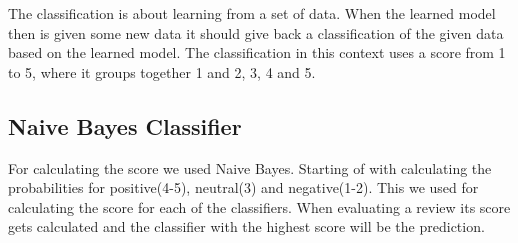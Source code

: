 The classification is about learning from a set of data.
When the learned model then is given some new data it should give back a classification of the given data based on the learned model.
The classification in this context uses a score from 1 to 5, where it groups together 1 and 2, 3, 4 and 5.
\subsection{Naive Bayes Classifier}
For calculating the score we used Naive Bayes.
Starting of with calculating the probabilities for positive(4-5), neutral(3) and negative(1-2).
This we used for calculating the score for each of the classifiers.
When evaluating a review its score gets calculated and the classifier with the highest score will be the prediction.
